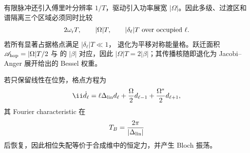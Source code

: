 有限脉冲还引入傅里叶分辨率 $1/T$，驱动引入功率展宽 $|\Omega|$。因此多级、过渡区和谱隔离三个区域必须同时比较
\begin{equation*}
2\omega_{\rm r}T,
\qquad |\Omega|T,
\qquad
|\delta_\ell|T\ \text{over occupied }\ell .
\end{equation*}
若所有显著占据格点满足 $|\delta_\ell|T\ll1$， 退化为平移对称能量格。跃迁面积 $\mathscr A_{\rm hop}=|\Omega|T/2$ 与 的 $|\beta|$ 对应，因此 $|\Omega|T=2|\beta|$；其传播核随即退化为 Jacobi--Anger 展开给出的 Bessel 权重。

若只保留线性在位势，格点方程为
\begin{equation}
\ii\dot d_\ell
=\ell\Delta_{\rm lin}d_\ell
+\frac\Omega2d_{\ell-1}
+\frac{\Omega^*}{2}d_{\ell+1},
\label{eq:synthetic_linear_force}
\end{equation}
其 Fourier characteristic 在
\begin{equation*}
T_B=\frac{2\pi}{|\Delta_{\rm lin}|}
\end{equation*}
后恢复，因此相位失配等价于合成维中的恒定力，并产生 Bloch 振荡。

